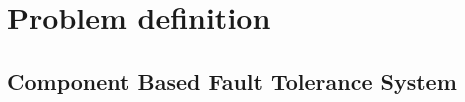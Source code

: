 \begin{comment}
heterogeneous sensor platform where the level of resource constrains would be
different as some are designed for doing very specific job (such as sensor
motes), some were designed for handling large traffic and relaying messages
(such as gateway), the sensor network will each be connected to different types
network interfaces, and will have different types of sensors connected. The
complexity involved grows exponentially high.

, subject to unreliable network, high risk of node failures, and expected
to run unattended for a long period of time, several work have been proposing
lightweight component models to ease the development and deployment for WSN
applications.

problem is to separate applications into components where each will be
encapsulated into a single unit of operation that could be mapped into
low-level hardware functions running on the sensor
nodes\cite{Hughes2012}\cite{Taherkordi2010}.

However, as most work in this field of research assume homogeneous sensor
platforms and application requirements, fault tolerant solution for one
application cannot be extended to other applications. The chance of reusability
in those solutions among applications is still low.

Advances in sensor, radio technology and programming tools in recent years
enables rapid development of complex WSN applications on heterogeneous sensor
platforms, however, as current architectures are built around the idea of
a long deployment cycle, rapid redeployment is nearly impossible execute.

By bringing component based middleware to the playground, we could decouple
application logic and actual implementation easily, fault tolerance can be
broken down into several components which can be reused in different stage of
the deployment.

\end{comment}

\section{Problem definition}

\subsection{Component Based Fault Tolerance System}

